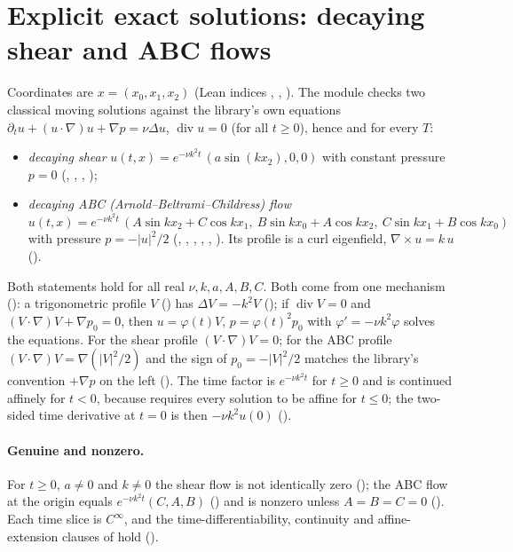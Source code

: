 \section{Explicit exact solutions: decaying shear and ABC flows}\label{sec:explicit}

Coordinates are $x=(x_0,x_1,x_2)$ (Lean indices , , ). The module 
checks two classical moving solutions against the library's own equations 
$\partial_tu+(u\cdot\nabla)u+\nabla p=\nu\Delta u$, $\operatorname{div}u=0$ (for all $t\ge0$), hence
 and  for every $T$:
\begin{itemize}[leftmargin=1.2em]
\item \emph{decaying shear} $u(t,x)=e^{-\nu k^2t}\,(a\sin(kx_2),0,0)$ with constant pressure $p=0$
(, , , );
\item \emph{decaying ABC (Arnold--Beltrami--Childress) flow}
$u(t,x)=e^{-\nu k^2t}\,(A\sin kx_2+C\cos kx_1,\ B\sin kx_0+A\cos kx_2,\ C\sin kx_1+B\cos kx_0)$ with pressure
$p=-|u|^2/2$ (, , , ,
, ). Its profile is a curl eigenfield,
$\nabla\times u=k\,u$ ().
\end{itemize}
Both statements hold for all real $\nu,k,a,A,B,C$. Both come from one mechanism
(): a trigonometric profile $V$ () has $\Delta V=-k^2V$
(); if $\operatorname{div}V=0$ and $(V\cdot\nabla)V+\nabla p_0=0$, then
$u=\varphi(t)V$, $p=\varphi(t)^2p_0$ with $\varphi'=-\nu k^2\varphi$ solves the equations. For the shear profile
$(V\cdot\nabla)V=0$; for the ABC profile $(V\cdot\nabla)V=\nabla(|V|^2/2)$ and the sign of $p_0=-|V|^2/2$ matches the
library's convention $+\nabla p$ on the left (). The time factor  is $e^{-\nu k^2t}$
for $t\ge0$ and is continued affinely for $t<0$, because  requires every solution to be
affine for $t\le0$; the two-sided time derivative at $t=0$ is then $-\nu k^2u(0)$ ().

\paragraph{Genuine and nonzero.} For $t\ge0$, $a\neq0$ and $k\neq0$ the shear flow is not identically zero
(); the ABC flow at the origin equals $e^{-\nu k^2t}(C,A,B)$
() and is nonzero unless $A=B=C=0$ (). Each time slice is
$C^\infty$, and the time-differentiability, continuity and affine-extension clauses of
 hold ().

